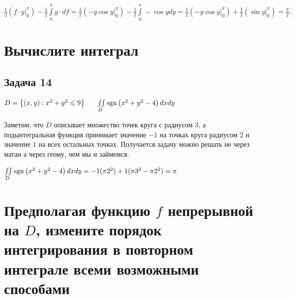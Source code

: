 \documentclass[a4paper, fleqn]{article}
\begin{document}
    $\frac{1}{2} \left(f \cdot g \Bigg|_{0}^{\pi} \right) - \frac{1}{2} \int\limits_{0}^{\pi} g \cdot df  =
    \frac{1}{2} \left(-y \cos y \Bigg|_{0}^{\pi} \right) - \frac{1}{2} \int\limits_{0}^{\pi} - \cos y dy = 
    \frac{1}{2} \left(-y \cos y \Bigg|_{0}^{\pi} \right) + \frac{1}{2}  \left(\sin y \Bigg|_{0}^{\pi} \right) = \frac{\pi}{2}.$
    
    
    \section*{Вычислите интеграл}
    
    \subsection*{Задача 14}
    $D = \left\{ (x, y): x^2 + y^2 \leqslant 9 \right\} \;\;\;\;\;\; \iint \limits_D \operatorname{\mathop{\mathrm{sgn}}} \left( x^2 + y^2 - 4 \right) dx dy$ 

    Заметим, что $D$ описывает множество точек круга с радиусом $3$, а подынтегральная функция принимает значение 
    $-1$ на точках круга радиусом $2$ и значение $1$ на всех остальных точках. 
    Получается задачу можно решать не через матан а через геому, чем мы и займемся.

    $\iint \limits_D \operatorname{\mathop{\mathrm{sgn}}} \left( x^2 + y^2 - 4 \right) dx dy = - 1 (\pi 2^2) + 1 (\pi 3^2 - \pi 2^2) = \pi$

    
    
    \section*{Предполагая функцию $f$ непрерывной на $D$, измените порядок интегрирования в повторном интеграле
    всеми возможными способами}
    
\end{document}
